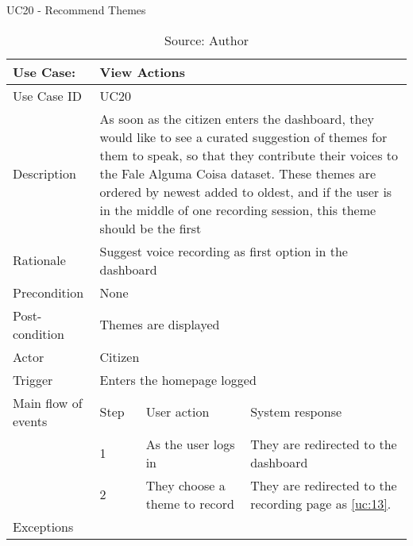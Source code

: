 \begin{table}[ht]
\centering
\caption{UC20 - Recommend Themes}
\label{uc:20}
\begin{tabular}{|p{3cm}|p{1cm}|p{5cm}|p{5cm}|}
\hline
Use Case:       & \multicolumn{3}{p{11cm}|}{View Actions} \\ \hline
Use Case ID     & \multicolumn{3}{p{11cm}|}{UC20} \\ \hline
Description     & \multicolumn{3}{p{11cm}|}{As soon as the citizen enters the dashboard, they would like to see a curated suggestion of themes for them to speak, so that they contribute their voices to the Fale Alguma Coisa dataset. These themes are ordered by newest added to oldest, and if the user is in the middle of one recording session, this theme should be the first} \\ \hline
Rationale       & \multicolumn{3}{p{11cm}|}{Suggest voice recording as first option in the dashboard} \\ \hline
Precondition    & \multicolumn{3}{p{11cm}|}{None} \\ \hline
Post-condition  & \multicolumn{3}{p{11cm}|}{Themes are displayed} \\ \hline
Actor           & \multicolumn{3}{p{11cm}|}{Citizen} \\ \hline
Trigger         & \multicolumn{3}{p{11cm}|}{Enters the homepage logged} \\ \hline
Main flow of events & Step  & User action & System response \\ \hline
                    & 1     & As the user logs in & They are redirected to the dashboard \\ \hline
                    & 2     & They choose a theme to record & They are redirected to the recording page as \ref{uc:13}. \\ \hline
Exceptions      & \multicolumn{3}{p{11cm}|}{} \\ \hline
\end{tabular}
\caption*{Source: Author}
\end{table}

